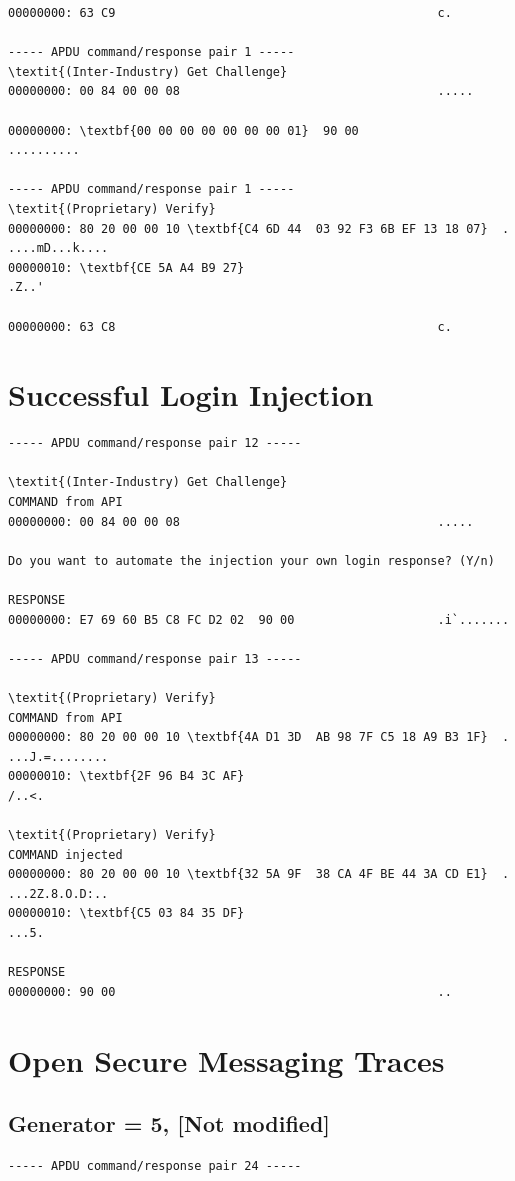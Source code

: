\documentclass[bsc,frontabs,twoside,singlespacing,parskip,deptreport]{infthesis}     %
\begin{document}
\begin{appendices}
\begin{Verbatim}[commandchars=\\\{\}, fontsize=\small]
00000000: 63 C9                                             c.

----- APDU command/response pair 1 -----
\textit{(Inter-Industry) Get Challenge}
00000000: 00 84 00 00 08                                    .....

00000000: \textbf{00 00 00 00 00 00 00 01}  90 00                    ..........

----- APDU command/response pair 1 -----
\textit{(Proprietary) Verify}
00000000: 80 20 00 00 10 \textbf{C4 6D 44  03 92 F3 6B EF 13 18 07}  . ....mD...k....
00000010: \textbf{CE 5A A4 B9 27}                                    .Z..'

00000000: 63 C8                                             c.
\end{Verbatim}
\section{Successful Login Injection}
\begin{Verbatim}[commandchars=\\\{\}, fontsize=\small]
----- APDU command/response pair 12 -----

\textit{(Inter-Industry) Get Challenge}
COMMAND from API
00000000: 00 84 00 00 08                                    .....

Do you want to automate the injection your own login response? (Y/n)

RESPONSE
00000000: E7 69 60 B5 C8 FC D2 02  90 00                    .i`.......

----- APDU command/response pair 13 -----

\textit{(Proprietary) Verify}
COMMAND from API
00000000: 80 20 00 00 10 \textbf{4A D1 3D  AB 98 7F C5 18 A9 B3 1F}  . ...J.=........
00000010: \textbf{2F 96 B4 3C AF}                                    /..<.

\textit{(Proprietary) Verify}
COMMAND injected
00000000: 80 20 00 00 10 \textbf{32 5A 9F  38 CA 4F BE 44 3A CD E1}  . ...2Z.8.O.D:..
00000010: \textbf{C5 03 84 35 DF}                                    ...5.

RESPONSE
00000000: 90 00                                             ..
\end{Verbatim}

\section{Open Secure Messaging Traces}
\subsection{Generator = 5, [Not modified]}
\begin{Verbatim}[commandchars=\\\{\}, fontsize=\small]
----- APDU command/response pair 24 -----


\end{Verbatim}
\end{appendices}
\end{document}

